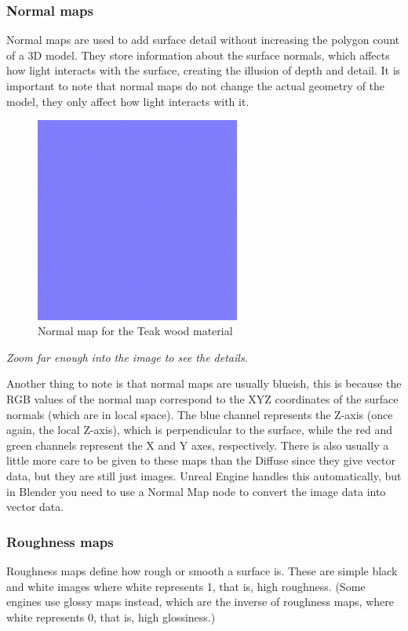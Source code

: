 \documentclass{article}
\begin{document}
\subsubsection{Normal maps}
Normal maps are used to add surface detail without increasing the polygon count of a 3D model. They store information about the surface normals, which affects how light interacts with the surface, creating the illusion of depth and detail. It is important to note that normal maps do not change the actual geometry of the model, they only affect how light interacts with it.
\begin{figure}[h]
    \centering
    \includegraphics[width=0.6\textwidth]{day2images/Teak_4k_Normal.jpg}
    \caption{Normal map for the Teak wood material}
    \label{fig:normal_map}
\end{figure}
\textit{Zoom far enough into the image to see the details.}

Another thing to note is that normal maps are usually blueish, this is because the RGB values of the normal map correspond to the XYZ coordinates of the surface normals (which are in local space). The blue channel represents the Z-axis (once again, the local Z-axis), which is perpendicular to the surface, while the red and green channels represent the X and Y axes, respectively. There is also usually a little more care to be given to these maps than the Diffuse since they give vector data, but they are still just images. Unreal Engine handles this automatically, but in Blender you need to use a Normal Map node to convert the image data into vector data.

\subsubsection{Roughness maps}
Roughness maps define how rough or smooth a surface is. These are simple black and white images where white represents 1, that is, high roughness. (Some engines use glossy maps instead, which are the inverse of roughness maps, where white represents 0, that is, high glossiness.)
\end{document}
